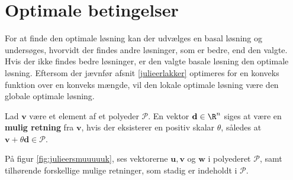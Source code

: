 \section{Optimale betingelser}
\label{julieerfantalastiskogvidunderlig}
%
For at finde den optimale løsning kan der udvælges en basal løsning og undersøges, hvorvidt der findes andre løsninger, som er bedre, end den valgte. 
Hvis der ikke findes bedre løsninger, er den valgte basale løsning den optimale løsning. 
Eftersom der jævnfør afsnit \ref{julieerlakker} optimeres for en konveks funktion over en konveks mængde, %
vil den lokale optimale løsning være den globale optimale løsning. 
%
%
\begin{defn}{}{}
Lad $\textbf{v}$ være et element af et polyeder $\mathcal{P}$.
En vektor $\textbf{d}\in \R^n$ siges at være en \textbf{mulig retning} fra $\textbf{v}$, hvis der eksisterer en positiv skalar $\theta$, således at $\textbf{v}+\theta \textbf{d}\in \mathcal{P}$.
\end{defn}
\noindent
%
På figur \ref{fig:julieersmuuuuuk}, ses vektorerne $\mathbf{u}, \mathbf{v}$ og $\mathbf{w}$ i polyederet $\mathcal{P}$, samt tilhørende forskellige mulige retninger, som stadig er indeholdt i $\mathcal{P}$.
%

%
%
